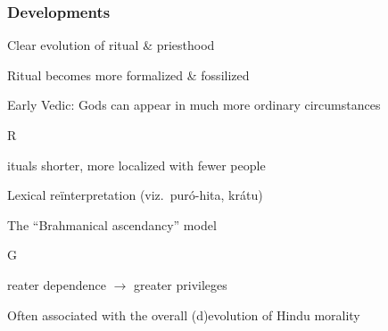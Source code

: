 \documentclass[pdf]{beamer}
\newcommand{\Subitem}[1]{{\setlength\itemindent{12pt} \item[-] #1}}
\begin{document}
\begin{frame} \frametitle{Developments}
\begin{itemize}
	\item Clear evolution of ritual \& priesthood
	\item Ritual becomes more formalized \& fossilized
	\item Early Vedic: Gods can appear in much more ordinary circumstances
	\Subitem Rituals shorter, more localized with fewer people
	\item Lexical reïnterpretation (viz.~puró-hita, krátu)
	\item The ``Brahmanical ascendancy'' model
	\Subitem Greater dependence $\rightarrow$ greater privileges
	\item Often associated with the overall (d)evolution of Hindu morality
\end{itemize}
\end{frame}

\end{document}
